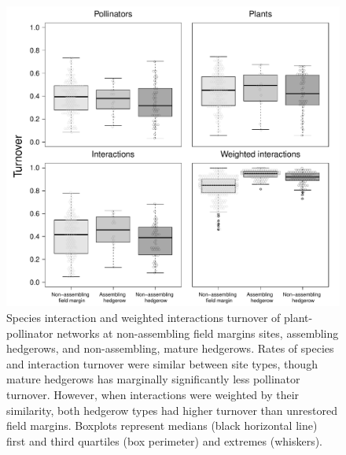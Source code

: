 \documentclass[12pt]{article}
\begin{document}
\begin{figure}
  \centering
  \includegraphics[width=1\textwidth]{../analysis/variability/figures/turnover_panels.pdf}
  \caption{Species interaction and weighted interactions turnover
    of plant-pollinator networks at non-assembling field margins
    sites, assembling hedgerows, and non-assembling, mature
    hedgerows. Rates of species and interaction turnover were similar
    between site types, though mature hedgerows has marginally
    significantly less pollinator turnover.  However, when
    interactions were weighted by their similarity, both hedgerow
    types had higher turnover than unrestored field margins. Boxplots
    represent medians (black horizontal line) first and third
    quartiles (box perimeter) and extremes (whiskers). }
  \label{fig:beta}
\end{figure}
\clearpage
\end{document}
